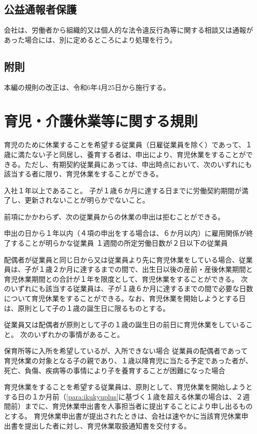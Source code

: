 \documentclass[10pt,a4paper,uplatex]{jsarticle}
\begin{document}
\subsection{公益通報者保護}

会社は、労働者から組織的又は個人的な法令違反行為等に関する相談又は通報があった場合には、別に定めるところにより処理を行う。

\subsection*{附則}
本編の規則の改正は、令和6年4月25日から施行する。



\clearpage
\section{育児・介護休業等に関する規則}

育児のために休業することを希望する従業員（日雇従業員を除く）であって、１歳に満たない子と同居し、養育する者は、申出により、育児休業をすることができる。ただし、有期契約従業員にあっては、申出時点において、次のいずれにも該当する者に限り、育児休業をすることができる。
\label{para:ChildcareLayoff}
\begin{enumerate}
    \itm 入社１年以上であること。
    \itm 子が１歳６か月に達する日までに労働契約期間が満了し、更新されないことが明らかでないこと。
\end{enumerate}
\term 前項にかかわらず、次の従業員からの休業の申出は拒むことができる。
\begin{enumerate}
    \itm 申出の日から１年以内（４項の申出をする場合は、６か月以内）に雇用関係が終了することが明らかな従業員
    \itm １週間の所定労働日数が２日以下の従業員
\end{enumerate}
\term 配偶者が従業員と同じ日から又は従業員より先に育児休業をしている場合、従業員は、子が１歳２か月に達するまでの間で、出生日以後の産前・産後休業期間と育児休業期間との合計が１年を限度として、育児休業をすることができる。
\label{para:ikukyuplus}
\term 次のいずれにも該当する従業員は、子が１歳６か月に達するまでの間で必要な日数について育児休業をすることができる。なお、育児休業を開始しようとする日は、原則として子の１歳の誕生日に限るものとする。
\begin{enumerate}
    \itm 従業員又は配偶者が原則として子の１歳の誕生日の前日に育児休業をしていること。
    \itm 次のいずれかの事情があること。
    \begin{enumerate}
        \itm 保育所等に入所を希望しているが、入所できない場合
        \itm 従業員の配偶者であって育児休業の対象となる子の親であり、１歳以降育児に当たる予定であった者が、死亡、負傷、疾病等の事情により子を養育することが困難になった場合
    \end{enumerate}
\end{enumerate}
\term 育児休業をすることを希望する従業員は、原則として、育児休業を開始しようとする日の１か月前（\ref{para:ikukyuplus}に基づく１歳を超える休業の場合は、２週間前）までに、育児休業申出書を人事担当者に提出することにより申し出るものとする。
\term 育児休業申出書が提出されたときは、会社は速やかに当該育児休業申出書を提出した者に対し、育児休業取扱通知書を交付する。
\end{document}
